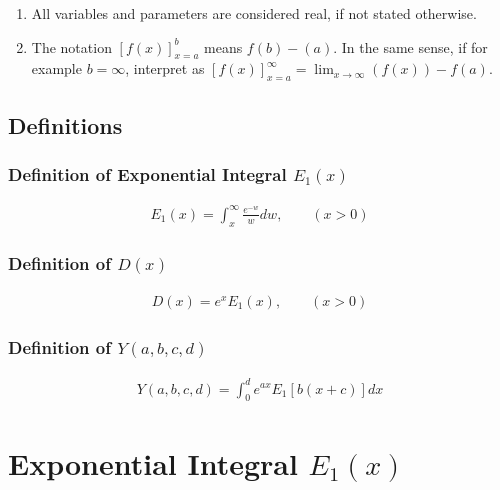 \documentclass[bibliography=totocnumbered]{scrartcl}
\newcommand{\assume}[1][\text{MISSING PARAMETER}]{,\qquad\left(#1\right)}
\begin{document}
	\begin{enumerate}
		\item All variables and parameters are considered real, if not stated otherwise.
		\item The notation $\left[f\left(x\right)\right]_{x=a}^{b}$ means $f\left(b\right)-\left(a\right)$. In the same sense, if for example $b=\infty$, interpret as $\left[f\left(x\right)\right]_{x=a}^{\infty}=\lim_{x\rightarrow{}\infty}\left(f\left(x\right)\right)-f\left(a\right)$.
	\end{enumerate}
	
	\subsection{Definitions}
	
	\subsubsection[Definition of Exponential Integral E1(x)]{Definition of Exponential Integral $E_1\left(x\right)$}
	
	\begin{gather}
		E_1\left(x\right)=\int_{x}^{\infty}\frac{e^{-w}}{w}dw\assume[x>0]\label{eq: E1}
	\end{gather}
	
	\subsubsection[Definition of D(x)]{Definition of $D\left(x\right)$}
	\label{subsubsec: D}
	
	\begin{gather}
		D\left(x\right)=e^xE_1\left(x\right)\assume[x>0]\label{eq: D}
	\end{gather}
	
	\subsubsection[Definition of Y(a,b,c,d)]{Definition of $Y\left(a, b, c, d\right)$}
	
	\begin{gather}
		Y\left(a, b, c, d\right)=\int_{0}^{d}e^{ax}E_1\left[b\left(x+c\right)\right]dx\label{eq: Y}
	\end{gather}
	
	\clearpage
	
	\section[Exponential Integral E1(x)]{Exponential Integral $E_1\left(x\right)$}
	
\end{document}
